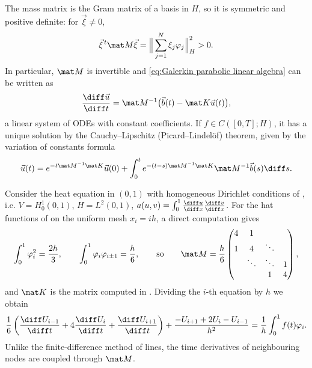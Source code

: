 The mass matrix is the Gram matrix of a basis in $H$, so it is symmetric and positive definite: for $\vec \xi \ne 0$,
\begin{equation*}
    \vec \xi^{\,t} \mat M \vec \xi = \Big\| \sum_{j=1}^N \xi_j \varphi_j \Big\|_H^2 > 0.
\end{equation*}
In particular, $\mat M$ is invertible and \eqref{eq:Galerkin parabolic linear algebra} can be written as
\begin{equation*}
    \frac{\diff \vec u}{\diff t} = \mat M^{-1} \big( \vec b(t) - \mat K \vec u(t) \big),
\end{equation*}
a linear system of ODEs with constant coefficients. If $f \in C([0,T];H)$, it has a unique solution by the Cauchy--Lipschitz (Picard--Lindelöf) theorem, given by the variation of constants formula
\begin{equation*}
    \vec u(t) = e^{-t \mat M^{-1}\mat K} \vec u(0) + \int_0^t e^{-(t-s) \mat M^{-1}\mat K} \mat M^{-1} \vec b(s) \diff s.
\end{equation*}
\begin{example}
    \label{ex:Galerkin heat piece-wise linear}
    Consider the heat equation in $(0,1)$ with homogeneous Dirichlet conditions of , i.e. $V = H^1_0(0,1)$, $H = L^2(0,1)$, $a(u,v) = \int_0^1 \frac{\diff u}{\diff x}\frac{\diff v}{\diff x}$.
    For the hat functions of  on the uniform mesh $x_i = ih$, a direct computation gives
    \begin{equation*}
        \int_0^1 \varphi_i^2 = \frac{2h}{3}, \qquad \int_0^1 \varphi_i \varphi_{i \pm 1} = \frac{h}{6},
        \qquad \text{so} \qquad
        \mat M = \frac h 6
        \begin{pmatrix}
            4 & 1      &        &   \\
            1 & 4      & \ddots &   \\
              & \ddots & \ddots & 1 \\
              &        & 1      & 4
        \end{pmatrix},
    \end{equation*}
    and $\mat K$ is the matrix computed in . Dividing the $i$-th equation by $h$ we obtain
    \begin{equation*}
        \frac{1}{6} \left( \frac{\diff U_{i-1}}{\diff t} + 4 \frac{\diff U_{i}}{\diff t} + \frac{\diff U_{i+1}}{\diff t} \right) + \frac{-U_{i+1} + 2U_i - U_{i-1}}{h^2} = \frac 1 h \int_0^1 f(t) \varphi_i .
    \end{equation*}
    Unlike the finite-difference method of lines, the time derivatives of neighbouring nodes are coupled through $\mat M$.
\end{example}

